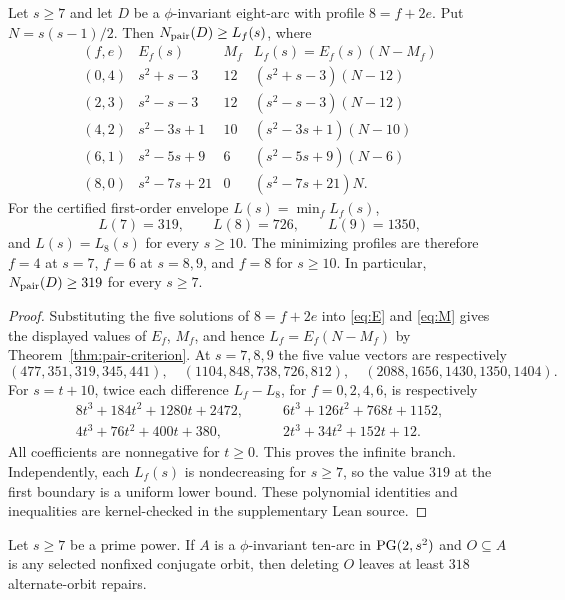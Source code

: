 \begin{theorem}\label{thm:profile-envelope}
Let $s\ge7$ and let $D$ be a $\phi$-invariant eight-arc with profile
$8=f+2e$.  Put $N=s(s-1)/2$.  Then $N_{\mathrm{pair}}(D)\ge L_f(s)$, where
\[
\begin{array}{c|c|c|c}
(f,e)&E_f(s)&M_f&L_f(s)=E_f(s)(N-M_f)\\ \hline
(0,4)&s^2+s-3&12&(s^2+s-3)(N-12)\\
(2,3)&s^2-s-3&12&(s^2-s-3)(N-12)\\
(4,2)&s^2-3s+1&10&(s^2-3s+1)(N-10)\\
(6,1)&s^2-5s+9&6&(s^2-5s+9)(N-6)\\
(8,0)&s^2-7s+21&0&(s^2-7s+21)N.
\end{array}
\]
For the certified first-order envelope $L(s)=\min_f L_f(s)$,
\[
  L(7)=319,\qquad L(8)=726,\qquad L(9)=1350,
\]
and $L(s)=L_8(s)$ for every $s\ge10$.  The minimizing profiles are therefore
$f=4$ at $s=7$, $f=6$ at $s=8,9$, and $f=8$ for $s\ge10$.
In particular, $N_{\mathrm{pair}}(D)\ge319$ for every $s\ge7$.
\end{theorem}

\begin{proof}
Substituting the five solutions of $8=f+2e$ into
\eqref{eq:E} and \eqref{eq:M} gives the displayed values of
$E_f$, $M_f$, and hence $L_f=E_f(N-M_f)$ by
Theorem~\ref{thm:pair-criterion}.  At $s=7,8,9$ the five value vectors are
respectively
\[
(477,351,319,345,441),\quad
(1104,848,738,726,812),\quad
(2088,1656,1430,1350,1404).
\]
For $s=t+10$, twice each difference $L_f-L_8$, for
$f=0,2,4,6$, is respectively
\[
\begin{aligned}
 8t^3+184t^2+1280t+2472,&\qquad
 6t^3+126t^2+768t+1152,\\
 4t^3+76t^2+400t+380,&\qquad
 2t^3+34t^2+152t+12.
\end{aligned}
\]
All coefficients are nonnegative for $t\ge0$.
This proves the infinite branch.  Independently, each $L_f(s)$ is
nondecreasing for $s\ge7$, so the value $319$ at the first boundary is a
uniform lower bound.  These polynomial identities and inequalities are
kernel-checked in the supplementary Lean source.
\end{proof}

\begin{corollary}
\label{cor:alternate-repair}
Let $s\ge7$ be a prime power.  If $A$ is a $\phi$-invariant ten-arc in
$\operatorname{PG}(2,s^2)$ and $O\subseteq A$ is any selected nonfixed conjugate orbit,
then deleting $O$ leaves at least $318$ alternate-orbit repairs.
\end{corollary}

